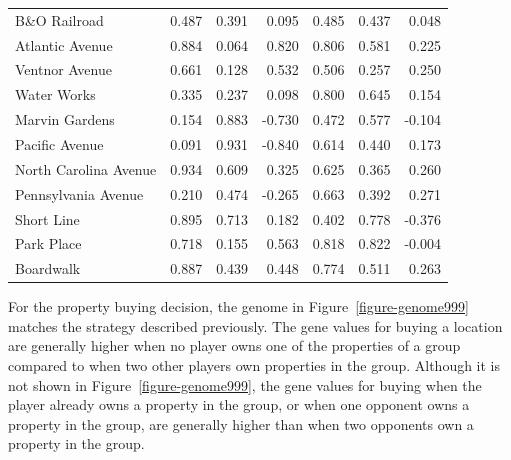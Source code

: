 \begin{table}[htbp]
{\begin{tabular}{lrrr|rrr}
    B\&O Railroad & 0.487  & 0.391  & 0.095  & 0.485  & 0.437  & 0.048 \\
    Atlantic Avenue & 0.884  & 0.064  & 0.820  & 0.806  & 0.581  & 0.225 \\
    Ventnor Avenue & 0.661  & 0.128  & 0.532  & 0.506  & 0.257  & 0.250 \\
    Water Works & 0.335  & 0.237  & 0.098  & 0.800  & 0.645  & 0.154 \\
    Marvin Gardens & 0.154  & 0.883  & -0.730 & 0.472  & 0.577  & -0.104 \\
    Pacific Avenue & 0.091  & 0.931  & -0.840 & 0.614  & 0.440  & 0.173 \\
    North Carolina Avenue & 0.934  & 0.609  & 0.325  & 0.625  & 0.365  & 0.260 \\
    Pennsylvania Avenue & 0.210  & 0.474  & -0.265 & 0.663  & 0.392  & 0.271 \\
    Short Line & 0.895  & 0.713  & 0.182  & 0.402  & 0.778  & -0.376 \\
    Park Place & 0.718  & 0.155  & 0.563  & 0.818  & 0.822  & -0.004 \\
    Boardwalk & 0.887  & 0.439  & 0.448  & 0.774  & 0.511  & 0.263 \\
    \bottomrule
    \end{tabular}}
  \label{tab:chromo_compare}%
\end{table}%

For the property buying decision, the genome in Figure~\ref{figure-genome999}
matches the strategy described previously. The gene values for buying a location
are generally higher when no player owns one of the properties of a group
compared to when two other players own properties in the group. Although it is
not shown in Figure~\ref{figure-genome999}, the gene values for buying when the
player already owns a property in the group, or when one opponent owns a
property in the group, are generally higher than when two opponents own a
property in the group.

